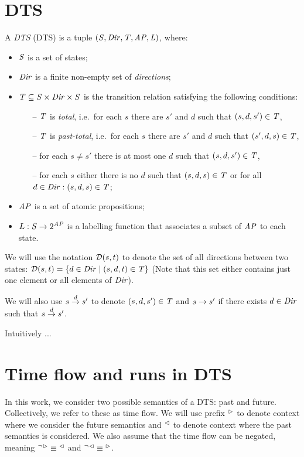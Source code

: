 \section{\Acl{DTS}}

A \emph{\acl{DTS}} (\acs{DTS}) is a tuple $(\mathit{S}, \mathit{Dir}, \mathit{T}, \mathit{AP}, \mathit{L})$, where:

\begin{itemize}
	\item $\mathit{S}$ is a set of states;
	\item $\mathit{Dir}$ is a finite non-empty set of \emph{directions};
	\item $\mathit{T} \subseteq \mathit{S} \times \mathit{Dir} \times \mathit{S}$ is the transition relation satisfying the following conditions:
	\begin{itemize}
		\item[--] $\mathit{T}$ is \emph{total}, i.e.~for each $s$ there are $s'$ and $d$ such that $(s, d,
		s')\in \mathit{T}$,
		\item[--] $\mathit{T}$ is \emph{past-total}, i.e.~for each $s$ there are $s'$ and $d$ such that
		$(s', d, s)\in \mathit{T}$,
		\item[--] for each $s \ne s'$ there is at most one $d$ such that $(s, d, s')\in \mathit{T}$,
		\item[--] for each $s$ either there is no $d$ such that $(s,d,s) \in \mathit{T}$ or
		for all $d \in \mathit{Dir}: (s,d,s) \in \mathit{T}$;
	\end{itemize}
	\item $\mathit{AP}$ is a set of atomic propositions;
	\item $L : \mathit{S} \rightarrow 2^{\mathit{AP}}$ is a labelling function that associates a subset of $\mathit{AP}$ to each state.
\end{itemize}

We will use the notation $\mathcal{D}(s, t)$ to denote the set of all directions between two states: $\mathcal{D}(s, t) = \{ d \in \mathit{Dir} \mid (s, d, t) \in \mathit{T} \}$ (Note that this set either contains just one element or all elements of $\mathit{Dir}$).

We will also use $s \stackrel{d}{\rightarrow} s'$ to denote $(s, d, s') \in \mathit{T}$ and $s \rightarrow s'$ if there exists $d \in \mathit{Dir}$ such that $s \stackrel{d}{\rightarrow} s'$.

Intuitively ...

\section{Time flow and runs in \ac{DTS}}

In this work, we consider two possible semantics of a \ac{DTS}: past and future. Collectively, we refer to these as time flow. We will use prefix ${}^\vartriangleright$ to denote context where we consider the future semantics and ${}^\vartriangleleft$ to denote context where the past semantics is considered. We also assume that the time flow can be negated, meaning ${}^{\neg}{}^\vartriangleright \equiv {}^\vartriangleleft$ and ${}^{\neg}{}^\vartriangleleft \equiv {}^\vartriangleright$.

